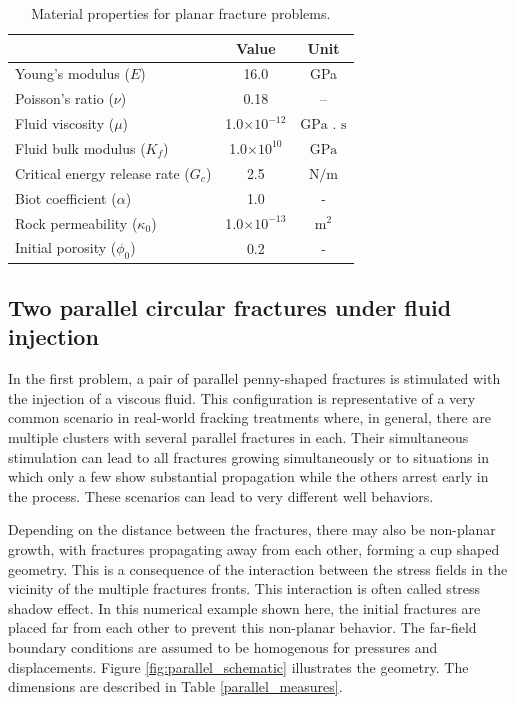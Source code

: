 \begin{table}[h]
  \centering
  \caption{Material properties for planar fracture problems.}
  \begin{tabular}[t]{lcc}
  \hline
  &Value &Unit \\
  \hline
  Young's modulus ($E$)&16.0&GPa\\
  Poisson's ratio ($\nu$)&0.18&--\\
  Fluid viscosity ($\mu$)&1.0$\times10^{-12}$&$\text{GPa . s}$\\
  Fluid bulk modulus ($K_f$)&1.0$\times10^{10}$&$\text{GPa}$\\
  Critical energy release rate ($G_c$)&2.5&$\text{N/m}$\\
  Biot coefficient ($\alpha$)&1.0&$\text{ - }$\\
  Rock permeability ($\kappa_0$)&1.0$\times 10^{-13}$&$\text{m}^2$\\
  Initial porosity ($\phi_0$)&0.2&$\text{-}$\\
  \hline
  \end{tabular}
  \label{material properties ch4}
\end{table}%

\subsection{Two parallel circular fractures under fluid injection}

In the first problem, a pair of parallel penny-shaped fractures is stimulated with the injection of a viscous fluid. This configuration is representative of a very common scenario in real-world fracking treatments where, in general, there are multiple clusters with several parallel fractures in each. Their simultaneous stimulation can lead to all fractures growing simultaneously or to situations in which only a few show substantial propagation while the others arrest early in the process. These scenarios can lead to very different well behaviors.   

Depending on the distance between the fractures, there may also be non-planar growth, with fractures propagating away from each other, forming a cup shaped geometry. This is a consequence of the interaction between the stress fields in the vicinity of the multiple fractures fronts. This interaction is often called stress shadow effect. In this numerical example shown here, the initial fractures are placed far from each other to prevent this non-planar behavior. The far-field boundary conditions are assumed to be homogenous for pressures and displacements. Figure \ref{fig:parallel_schematic} illustrates the geometry. The dimensions are described in Table \ref{parallel_measures}.

